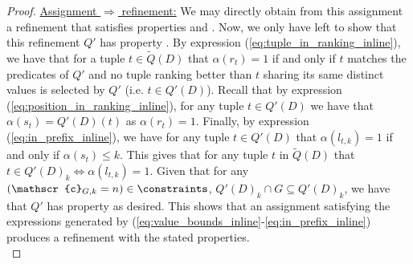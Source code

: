 \begin{proof}
    \underline{Assignment $\Longrightarrow$ refinement:} We may directly obtain from this assignment a refinement that satisfies properties  and . Now, we only have left to show that this refinement $Q'$ has property . By expression (\ref{eq:tuple_in_ranking_inline}), we have that for a tuple $t \in \widetilde{Q}(D)$ that $\alpha(r_t) = 1$ if and only if $t$ matches the predicates of $Q'$ and no tuple ranking better than $t$ sharing its same distinct values is selected by $Q'$ (i.e. $t \in Q'(D)$). Recall that by expression (\ref{eq:position_in_ranking_inline}), for any tuple $t \in Q'(D)$ we have that $\alpha(s_t) = Q'(D)(t)$ as $\alpha(r_t) = 1$. Finally, by expression (\ref{eq:in_prefix_inline}), we have for any tuple $t \in Q'(D)$ that $\alpha(l_{t, k}) = 1$ if and only if $\alpha(s_t) \leq k$. This gives that for any tuple $t$ in $\widetilde{Q}(D)$ that $t \in Q'(D)_k \iff \alpha(l_{t, k}) = 1$.  Given that for any $(\mathscr{c}_{G, k} = n) \in \constraints$, $Q'(D)_k \cap G \subseteq Q'(D)_k$, we have that $Q'$ has property  as desired. This shows that an assignment satisfying  the expressions generated by (\ref{eq:value_bounds_inline}-\ref{eq:in_prefix_inline}) produces a refinement with the stated properties. \\

\end{proof}
